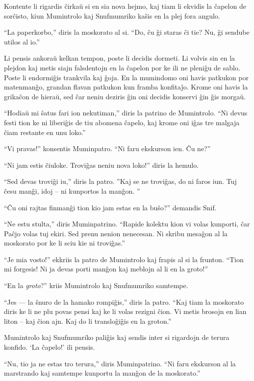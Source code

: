 Kontente li rigardis ĉirkaŭ si en sia nova hejmo, kaj tiam li ekvidis la ĉapelon de sorĉisto, kiun Mumintrolo kaj Snufmumriko kaŝis en la plej fora angulo.

``La paperkorbo,'' diris la moskorato al si. ``Do, ĉu ĝi staras ĉi tie? Nu, ĝi sendube utilos al io.''

Li pensis ankoraŭ kelkan tempon, poste li decidis dormeti. Li volvis sin en la plejdon kaj metis siajn falsdentojn en la ĉapelon por ke ili ne pleniĝu de sablo. Poste li endormiĝis trankvila kaj ĝoja.
\sectionbreak
En la mumindomo oni havis patkukon por matenmanĝo, grandan flavan patkukon kun framba konfitaĵo. Krome oni havis la grikaĉon de hieraŭ, sed ĉar neniu deziris ĝin oni decidis konservi ĝin ĝis morgaŭ.

``Hodiaŭ mi ŝatus fari ion nekutiman,'' diris la patrino de Mumintrolo. ``Ni devus festi tion ke ni liberiĝis de tiu abomena ĉapelo, kaj krome oni iĝas tre malgaja ĉiam restante en unu loko.''

``Vi pravas!'' konsentis Muminpatro. ``Ni faru ekskurson ien. Ĉu ne?''

``Ni jam estis ĉiuloke. Troviĝas neniu nova loko!'' diris la hemulo.

``Sed devas troviĝi iu,'' diris la patro. ''Kaj se ne troviĝas, do ni faros iun. Tuj ĉesu manĝi, idoj -- ni kunportos la manĝon. ''

``Ĉu oni rajtas finmanĝi tion kio jam estas en la buŝo?'' demandis Snif.

``Ne estu stulta,'' diris Muminpatrino. ``Rapide kolektu kion vi volas kunporti, ĉar Paĉjo volas tuj ekiri. Sed prenu nenion nenecesan. Ni skribu mesaĝon al la moskorato por ke li sciu kie ni troviĝas.''

``Je mia vosto!'' ekkriis la patro de Mumintrolo kaj frapis al si la frunton. ``Tion mi forgesis! Ni ja devas porti manĝon kaj meblojn al li en la groto!''

``En la \emph{groto}?'' kriis Mumintrolo kaj Snufmumriko samtempe.

``Jes --- la ŝnuro de la hamako rompiĝis,'' diris la patro. ``Kaj tiam la moskorato diris ke li ne plu povas pensi kaj ke li volas rezigni ĉion. Vi metis brosojn en lian liton -- kaj ĉion ajn. Kaj do li transloĝiĝis en la groton.''

Mumintrolo kaj Snufmumriko paliĝis kaj sendis inter si rigardojn de terura konfido. `La ĉapelo!' ili pensis.

``Nu, tio ja ne estas tro terura,'' diris Muminpatrino. ``Ni faru ekskurson al la marstrando kaj samtempe kunportu la manĝon de la moskorato.''

